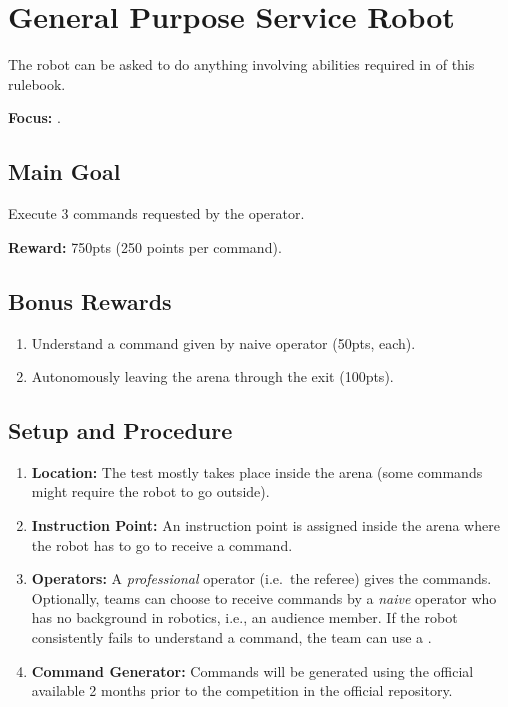 \section{General Purpose Service Robot}
\label{test:gpsr}
The robot can be asked to do anything involving abilities required in \SONE{} of this rulebook.

\noindent \textbf{Focus:} \SysI.

\subsection*{Main Goal}
Execute 3 commands requested by the operator.

\noindent\textbf{Reward:} 750pts (250 points per command).

\subsection*{Bonus Rewards}
\begin{enumerate}[nosep]
	\item Understand a command given by naive operator (50pts, each).
	\item Autonomously leaving the arena through the exit (100pts).
\end{enumerate}

%
%
\subsection*{Setup and Procedure}
\begin{enumerate}[nosep]
	\item \textbf{Location:} The test mostly takes place inside the arena (some commands might require the robot to go outside).
	
	\item \textbf{Instruction Point:} An instruction point is assigned inside the arena where the robot has to go to receive a command.
	
	\item \textbf{Operators:} A \emph{professional} operator (i.e.~the referee) gives the commands. Optionally, teams can choose to receive commands by a \emph{naive} operator who has no background in robotics, i.e., an audience member. If the robot consistently fails to understand a command, the team can use a \CustomOperator{}.
	
	\item \textbf{Command Generator:} Commands will be generated using the official \CommandGen{} available 2 months prior to the competition in the official repository\footnotemark {}.
\end{enumerate}


